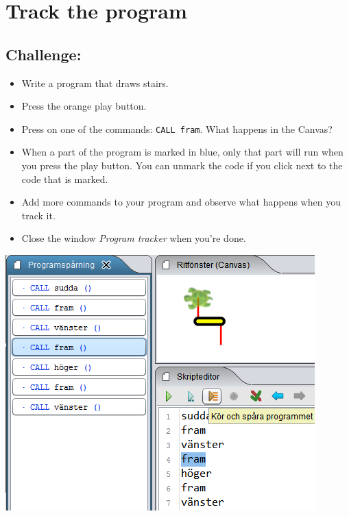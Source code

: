 \chapter{Track the program}
\begin{multicols}{2}
\section*{\color{BrickRed}Challenge:}


\begin{itemize}

\item {Write a program that draws stairs.}
\item {Press the orange play button.}
\item {Press on one of the commands: \lstinline{CALL fram}. What happens in the Canvas?}
\item {When a part of the program is marked in blue, only that part will run when you press the play button. You can unmark the code if you click next to the code that is marked. }
\item {Add more commands to your program and observe what happens when you track it.}
\item {Close the window {\it Program tracker} when you're done.}

\end{itemize}



\columnbreak

\begin{center}
\includegraphics{../img/trace.png}
\end{center}

\end{multicols}

